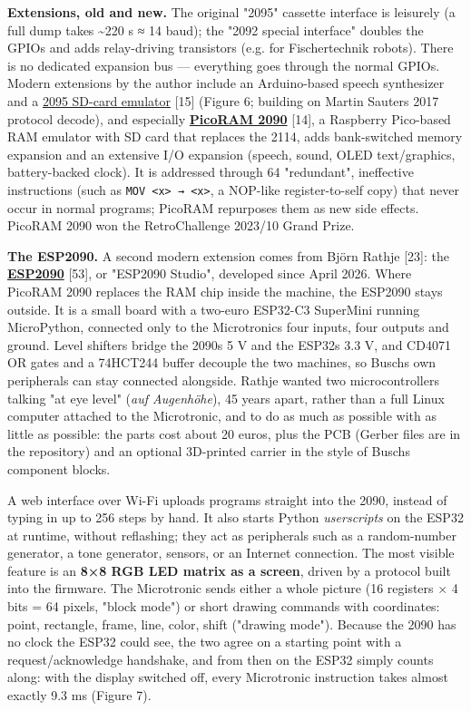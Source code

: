 \documentclass[
  11pt,
  letterpaper,
]{article}
\begin{document}
\textbf{Extensions, old and new.} The original "2095" cassette interface
is leisurely (a full dump takes \textasciitilde220 s ≈ 14 baud); the
"2092 special interface" doubles the GPIOs and adds relay-driving
transistors (e.g. for Fischertechnik robots). There is no dedicated
expansion bus --- everything goes through the normal GPIOs. Modern
extensions by the author include an Arduino-based speech synthesizer and
a
\href{https://github.com/lambdamikel/microtronic-2095-arduino-emulator}{2095
SD-card emulator} {[}15{]} (Figure 6; building on Martin
Sauter\textquotesingle s 2017 protocol decode), and especially
\href{https://github.com/lambdamikel/picoram2090}{\textbf{PicoRAM 2090}}
{[}14{]}, a Raspberry Pico-based RAM emulator with SD card that replaces
the 2114, adds bank-switched memory expansion and an extensive I/O
expansion (speech, sound, OLED text/graphics, battery-backed clock). It
is addressed through 64 "redundant", ineffective instructions (such as
\texttt{MOV\ \textless{}x\textgreater{}\ →\ \textless{}x\textgreater{}},
a NOP-like register-to-self copy) that never occur in normal programs;
PicoRAM repurposes them as new side effects. PicoRAM 2090 won the
RetroChallenge 2023/10 Grand Prize.

\textbf{The ESP2090.} A second modern extension comes from Björn Rathje
{[}23{]}: the
\href{https://github.com/rab-berlin/ESP2090}{\textbf{ESP2090}} {[}53{]},
or "ESP2090 Studio", developed since April 2026. Where PicoRAM 2090
replaces the RAM chip inside the machine, the ESP2090 stays outside. It
is a small board with a two-euro ESP32-C3 SuperMini running MicroPython,
connected only to the Microtronic\textquotesingle s four inputs, four
outputs and ground. Level shifters bridge the 2090\textquotesingle s 5 V
and the ESP32\textquotesingle s 3.3 V, and CD4071 OR gates and a
74HCT244 buffer decouple the two machines, so Busch\textquotesingle s
own peripherals can stay connected alongside. Rathje wanted two
microcontrollers talking "at eye level" (\emph{auf Augenhöhe}), 45 years
apart, rather than a full Linux computer attached to the Microtronic,
and to do as much as possible with as little as possible: the parts cost
about 20 euros, plus the PCB (Gerber files are in the repository) and an
optional 3D-printed carrier in the style of Busch\textquotesingle s
component blocks.

A web interface over Wi-Fi uploads programs straight into the 2090,
instead of typing in up to 256 steps by hand. It also starts Python
\emph{userscripts} on the ESP32 at runtime, without reflashing; they act
as peripherals such as a random-number generator, a tone generator,
sensors, or an Internet connection. The most visible feature is an
\textbf{8×8 RGB LED matrix as a screen}, driven by a protocol built into
the firmware. The Microtronic sends either a whole picture (16 registers
× 4 bits = 64 pixels, "block mode") or short drawing commands with
coordinates: point, rectangle, frame, line, color, shift ("drawing
mode"). Because the 2090 has no clock the ESP32 could see, the two agree
on a starting point with a request/acknowledge handshake, and from then
on the ESP32 simply counts along: with the display switched off, every
Microtronic instruction takes almost exactly 9.3 ms (Figure 7).
\end{document}

